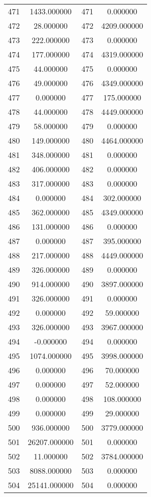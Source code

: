 \documentclass[12pt]{article}
\begin{document}
\begin{longtable}{@{}cccc@{}}
471 & 1433.000000 & 471 & 0.000000 \\
472 & 28.000000 & 472 & 4209.000000 \\
473 & 222.000000 & 473 & 0.000000 \\
474 & 177.000000 & 474 & 4319.000000 \\
475 & 44.000000 & 475 & 0.000000 \\
476 & 49.000000 & 476 & 4349.000000 \\
477 & 0.000000 & 477 & 175.000000 \\
478 & 44.000000 & 478 & 4449.000000 \\
479 & 58.000000 & 479 & 0.000000 \\
480 & 149.000000 & 480 & 4464.000000 \\
481 & 348.000000 & 481 & 0.000000 \\
482 & 406.000000 & 482 & 0.000000 \\
483 & 317.000000 & 483 & 0.000000 \\
484 & 0.000000 & 484 & 302.000000 \\
485 & 362.000000 & 485 & 4349.000000 \\
486 & 131.000000 & 486 & 0.000000 \\
487 & 0.000000 & 487 & 395.000000 \\
488 & 217.000000 & 488 & 4449.000000 \\
489 & 326.000000 & 489 & 0.000000 \\
490 & 914.000000 & 490 & 3897.000000 \\
491 & 326.000000 & 491 & 0.000000 \\
492 & 0.000000 & 492 & 59.000000 \\
493 & 326.000000 & 493 & 3967.000000 \\
494 & -0.000000 & 494 & 0.000000 \\
495 & 1074.000000 & 495 & 3998.000000 \\
496 & 0.000000 & 496 & 70.000000 \\
497 & 0.000000 & 497 & 52.000000 \\
498 & 0.000000 & 498 & 108.000000 \\
499 & 0.000000 & 499 & 29.000000 \\
500 & 936.000000 & 500 & 3779.000000 \\
501 & 26207.000000 & 501 & 0.000000 \\
502 & 11.000000 & 502 & 3784.000000 \\
503 & 8088.000000 & 503 & 0.000000 \\
504 & 25141.000000 & 504 & 0.000000 \\

\end{longtable}
\end{document}
